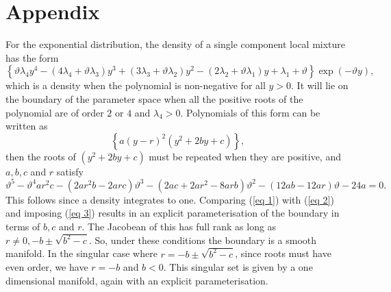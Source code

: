 \documentclass[graybox]{svmult}
\begin{document}
\appendix


\section*{Appendix}

For the exponential distribution, the density of a single component local mixture has the form
\begin{equation}\label{eq 1} 
\left\{\vartheta \lambda_4 y^4-(4 \lambda_4+\vartheta \lambda_3) y^3+(3\lambda_3 + \vartheta\lambda_2)y^2-(2 \lambda_2+ \vartheta \lambda_1) y+ \lambda_1+\vartheta  \right\} \exp(- \vartheta y),
\end{equation} which is a density when the polynomial is non-negative for all $y > 0$. It will lie on the boundary of the parameter space when all the positive roots of the polynomial are of order $2$ or $4$ and $\lambda_4 > 0$. Polynomials of this form can be written as
\begin{equation}\label{eq 2} 
\left\{ a(y-r)^2(y^2+2by+c) \right\},
\end{equation}  
then the roots of $(y^2+2by+c)$ must be  repeated  when they are positive,  and $a,b,c$ and $r$ satisfy 
\begin{equation}\label{eq 3} 
\vartheta^5-\vartheta^4ar^2c-(2ar^2b-2arc)\vartheta^3-(2ac+2ar^2-8arb)\vartheta^2-(12ab-12ar)\vartheta-24a =0.
\end{equation} This follows since a density integrates  to one. Comparing (\ref{eq 1}) with (\ref{eq 2}) and imposing (\ref{eq 3}) results in an explicit parameterisation of the boundary in terms of $b,c$ and $r$. The Jacobean of this has full rank as long as $r \ne 0, -b\pm \sqrt{b^2-c}.$ So, under these conditions the boundary is a smooth manifold. 
In the singular case where  $r= -b\pm \sqrt{b^2-c}$, since roots must have even order, we have $r= -b$ and  $b < 0$. This singular set is given by a one dimensional manifold, again with an explicit parameterisation.




%


 

\end{document}
